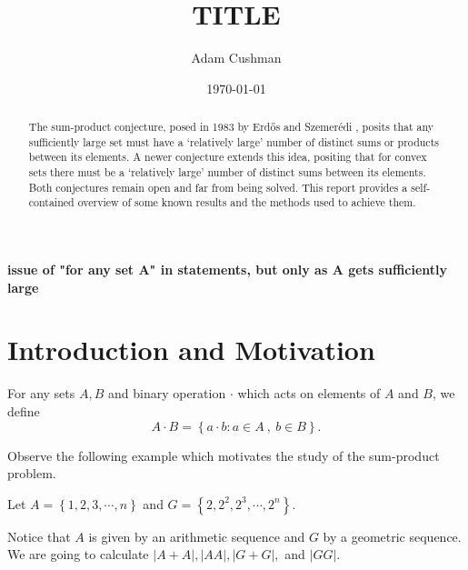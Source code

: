 \documentclass[12pt]{amsart}
\begin{document}
\title{\textbf{TITLE}} 


\author[Cushman]{Adam Cushman}
\address{Department of Mathematics\\
         Indiana University,
         Bloomington, IN 47405
         USA} 
\date{\today}

\begin{abstract}
The sum-product conjecture, posed in 1983 by Erd{\H{o}}s and Szemer{\'e}di \cite{erdos-szemeredi}, 
posits that any sufficiently large set must have a `relatively large' number
of distinct sums or products between its elements.
A newer conjecture extends this idea, positing that for convex sets there must be a `relatively large'
number of distinct sums between its elements. Both conjectures remain open and far from being solved.
This report provides a self-contained overview of some known results and the methods
used to achieve them.
\end{abstract}

\maketitle


\textbf{issue of "for any set A" in statements, but only as A gets sufficiently large}

\section{Introduction and Motivation} 

For any sets \(A,B\) and binary operation \(\cdot \) which acts on elements of \(A\) and \(B\), we define
\[
    A \cdot  B = \left\{ a \cdot  b : a \in A~,~ b \in B \right\} 
.\]

Observe the following example which motivates the study of the sum-product problem.

Let \(A = \left\{ 1, 2, 3, \cdots, n \right\}\) and \(G = \left\{ 2, 2^{2}, 2^{3}, \cdots , 2^{n} \right\}\).

Notice that \(A\) is given by an arithmetic sequence and \(G\) by a geometric sequence.
We are going to calculate \(\left\lvert A+A \right\rvert , \left\lvert AA \right\rvert , \left\lvert G+G \right\rvert ,\) and \(\left\lvert GG \right\rvert \).
\end{document}
